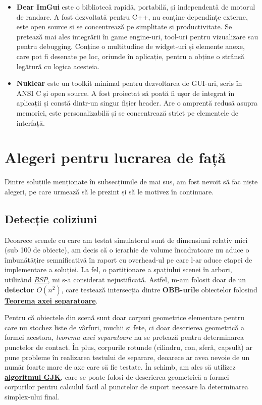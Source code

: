 \documentclass[12pt,a4paper]{report}
\begin{document}
\begin{enumerate}
	\begin{itemize}
		\item \textbf{Dear ImGui}\cite{imgui} este o bibliotecă rapidă, portabilă, și independentă de motorul de randare. A fost dezvoltată pentru C++, nu conține dependințe externe, este open source și se concentrează pe simplitate și productivitate. Se pretează mai ales integrării în game engine-uri, tool-uri pentru vizualizare sau pentru debugging. Conține o multitudine de widget-uri și elemente anexe, care pot fi desenate pe loc, oriunde în aplicație, pentru a obține o strânsă legătură cu logica acesteia.
		\item \textbf{Nuklear}\cite{nuklear} este un toolkit minimal pentru dezvoltarea de GUI-uri, scris în ANSI C și open source. A fost proiectat să poată fi ușor de integrat în aplicații și constă dintr-un singur fișier header. Are o amprentă redusă asupra memoriei, este personalizabilă și se concentrează strict pe elementele de interfață.
	\end{itemize}
\end{enumerate}

\section{Alegeri pentru lucrarea de față}

Dintre soluțiile menționate în subsecțiunile de mai sus, am fost nevoit să fac niște alegeri, pe care urmează să le prezint și să le motivez în continuare.

\subsection{Detecție coliziuni}

Deoarece scenele cu care am testat simulatorul sunt de dimensiuni relativ mici (sub 100 de obiecte), am decis că o ierarhie de volume încadratoare nu aduce o îmbunătățire semnificativă în raport cu overhead-ul pe care l-ar aduce etapei de implementare a soluției. La fel, o partiționare a spațiului scenei în arbori, utilizând \hyperref[bsp]{\textit{BSP}}, mi s-a considerat nejustificată. Astfel, m-am folosit doar de un \textbf{detector $O(n^2)$}, care testează intersecția dintre \textbf{OBB-urile} obiectelor folosind \hyperref[SAT]{\textbf{Teorema axei separatoare}}.

Pentru că obiectele din scenă sunt doar corpuri geometrice elementare pentru care nu stochez liste de vârfuri, muchii și fețe, ci doar descrierea geometrică a formei acestora, \textit{teorema axei separatoare} nu se pretează pentru determinarea punctelor de contact. În plus, corpurile rotunde (cilindru, con, sferă, capsulă) ar pune probleme în realizarea testului de separare, deoarece ar avea nevoie de un număr foarte mare de axe care să fie testate. În schimb, am ales să utilizez \hyperref[gjk_intersection_test]{\textbf{algoritmul GJK}}, care se poate folosi de descrierea geometrică a formei corpurilor pentru calculul facil al punctelor de suport necesare la determinarea simplex-ului final.
\end{document}
